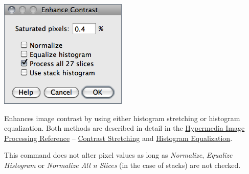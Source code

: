 \begin{minipage}[c][1\totalheight][t]{0.342\columnwidth}%
\includegraphics[scale=0.55]{images/EnhanceContrast}%
\end{minipage}%
\begin{minipage}[c][1\totalheight][t]{0.658\columnwidth}%
Enhances image contrast by using either histogram stretching or histogram
equalization. Both methods are described in detail in the \href{http://homepages.inf.ed.ac.uk/rbf/HIPR2/}{Hypermedia Image Processing Reference}
-- \href{http://homepages.inf.ed.ac.uk/rbf/HIPR2/stretch.htm\#1}{Contrast Stretching}
and \href{http://homepages.inf.ed.ac.uk/rbf/HIPR2/histeq.htm\#1}{Histogram Equalization}.

\medskip{}
This command does not alter pixel values as long as \emph{Normalize},
\emph{Equalize Histogram} or \emph{Normalize All n Slices} (in the
case of stacks) are not checked.%
\end{minipage}
